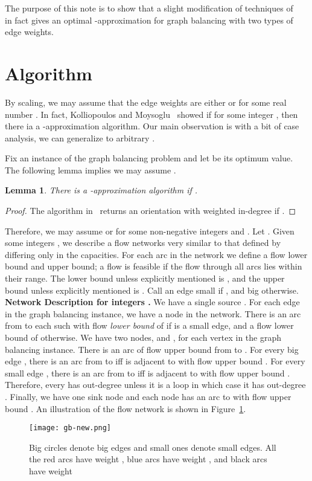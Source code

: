 \documentclass[11pt]{article}
\newtheorem{lemma}{Lemma}
\begin{document}
The purpose of this note is to show that a slight modification of techniques of ~\cite{KM}  in fact gives an optimal -approximation for graph balancing with two types of edge weights.


\section{Algorithm}
By scaling, we may assume that the edge weights are either  or  for some real number . 
In fact, Kolliopoulos and Moysoglu~\cite{KM} showed if  for some integer , then there ia a -approximation algorithm. 
Our main observation is with a bit of case analysis, we can generalize to arbitrary .

Fix an instance of the graph balancing problem and let  be its optimum value. The following lemma implies we may assume .
\begin{lemma}\label{lem:1}
	There is a -approximation algorithm if . \end{lemma}
\begin{proof}
	The algorithm in~\cite{LST} returns an orientation with weighted in-degree  if . \end{proof}
Therefore, we may assume  or  for some non-negative integers  and . 
\noindent
Let . Given some integers , we describe a flow networks  very similar to that defined by~\cite{KM} differing only in the capacities. For each arc in the network we define a flow lower bound and upper bound; a flow is feasible if the flow through all arcs lies within their range. The lower bound unless explicitly mentioned is , and the upper bound unless explicitly mentioned is .
Call an edge  small if , and big otherwise. \\

\noindent
{\bf Network Description  for integers .} We have a single source . For each edge  in the graph balancing instance, we have a node  in the network. There is an arc from  to each such  
with flow {\em lower bound} of  if  is a small edge, and a flow lower bound of  otherwise. We have two nodes,  and , for each vertex  in the graph balancing instance.
There is an arc of flow upper bound  from  to .
For every big edge , there is an arc from  to  iff  is adjacent to  with flow upper bound . 
For every small edge , there is an arc from  to  iff  is adjacent to  with flow upper bound . 
Therefore, every  has out-degree  unless it is a loop in which case it has out-degree . 
Finally, we have one sink node  and each node  has an arc to  with flow upper bound  . 
An illustration of the flow network is shown in Figure~\ref{fig:gb}.
\begin{figure}[h!]
	\begin{center}
		\texttt{[image: gb-new.png]}
	\end{center}
	\caption{\small Big circles denote big edges and small ones denote small edges. All the red arcs have weight , blue arcs have weight , and black arcs have weight }
	\label{fig:gb}
\end{figure}
\end{document}
